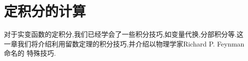 \chapter{定积分的计算}
对于实变函数的定积分,我们已经学会了一些积分技巧,如变量代换,分部积分等.这一章我们将介绍利用留数定理的积分技巧,并介绍以物理学家Richard P. Feynman命名的
特殊技巧.

% 


% 